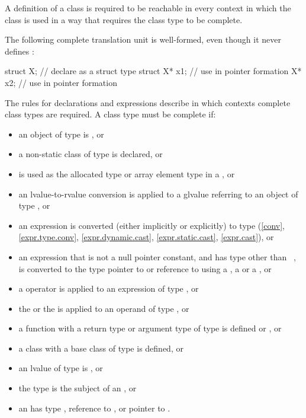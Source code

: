 \pnum
{}%
A definition of a class is required to be reachable in every context in which
the class is used in a way that requires the class type to be complete.
\begin{example}
The following complete translation unit is well-formed,
even though it never defines :
\begin{codeblock}
struct X;                       // declare  as a struct type
struct X* x1;                   // use  in pointer formation
X* x2;                          // use  in pointer formation
\end{codeblock}
\end{example}
\begin{note}
The rules for declarations and expressions
describe in which contexts complete class types are required. A class
type  must be complete if:
\begin{itemize}
\item an object of type  is , or
\item a non-static class  of
type  is declared, or
\item {} is used as the allocated type or array element type in a
, or
\item an lvalue-to-rvalue conversion is applied to
a glvalue referring
to an object of type , or
\item an expression is converted (either implicitly or explicitly) to
type  (\ref{conv}, \ref{expr.type.conv},
\ref{expr.dynamic.cast}, \ref{expr.static.cast}, \ref{expr.cast}), or
\item an expression that is not a null pointer constant, and has type
other than \cv{}~, is converted to the type pointer to 
or reference to  using a ,
a  or
a , or
\item a  operator is applied to an expression of type
, or
\item the  or the
 is applied to an operand of
type , or
\item a function with a return type or argument type of type 
is defined or , or
\item a class with a base class of type  is
defined, or
\item an lvalue of type  is , or
\item the type  is the subject of an
, or
\item an  has type , reference to
, or pointer to .
\end{itemize}
\end{note}


